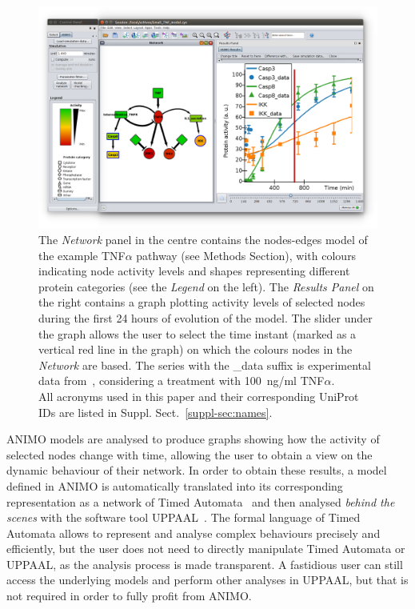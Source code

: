 \documentclass{bmcart}
\begin{document}
\begin{figure}[htbp]
\begin{center}
   \includegraphics[width=.85\textwidth]{images/screenshotTNFmodelSmall}
\end{center}
\caption{
The \emph{Network} panel in the centre contains the nodes-edges
model of the example TNF$\alpha$ pathway (see Methods Section), with
colours indicating node activity levels and shapes representing different protein categories (see the \emph{Legend} on the left).
The \emph{Results Panel} on the right contains a graph plotting activity levels of selected nodes
during the first 24 hours of evolution of the model. The slider under the graph
allows the user to select the time instant (marked as a vertical red line in the graph) on which
the colours nodes in the \emph{Network} are based.
The series with the {\sf \_data} suffix is experimental
data from~\cite{pathway-compendium}, considering a treatment with 100~ng/ml TNF$\alpha$.\\
All acronyms used in this paper
and their corresponding UniProt IDs are listed in Suppl. Sect.~\ref{suppl-sec:names}.
\label{fig:cytoscape}}
\end{figure}


ANIMO models are analysed to produce graphs showing how the activity of selected nodes
change with time, allowing the user to obtain a view on the dynamic behaviour of their network.
In order to obtain these results, a model defined in ANIMO is automatically translated into
its corresponding representation as a network of Timed Automata~\cite{timed-automata-alur-dill}
and then analysed \emph{behind the scenes} with the software tool UPPAAL~\cite{uppaal}.
The formal language of Timed Automata allows to represent and analyse complex behaviours precisely and efficiently,
but the user does not need to directly manipulate Timed Automata or UPPAAL, as the analysis process is made transparent.
A fastidious user can still access the underlying models and perform other analyses in UPPAAL,
but that is not required in order to fully profit from ANIMO.
\end{document}

